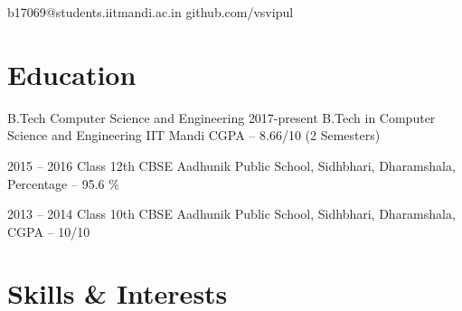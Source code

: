 \documentclass{tccv}
\begin{document}
    {b17069@students.iitmandi.ac.in}
    {github.com/vsvipul}

\section{Education}

\begin{yearlist}

\item[B.Tech Computer Science and Engineering]{2017-present}
     {B.Tech in Computer Science and Engineering}
     {\large{IIT Mandi} \newline CGPA -- 8.66/10 (2 Semesters)}

\item{2015 -- 2016}
     {Class 12th CBSE}
     {Aadhunik Public School, Sidhbhari, Dharamshala, Percentage -- 95.6 \%}

\item{2013 -- 2014}
     {Class 10th CBSE}
     {Aadhunik Public School, Sidhbhari, Dharamshala, CGPA -- 10/10}

\end{yearlist}








\section{Skills \& Interests}
\end{document}
